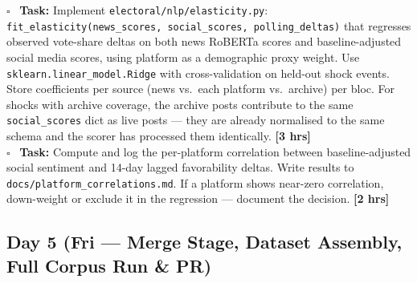 \documentclass[11pt]{article}
\newcommand{\hrs}[1]{\textbf{[#1 hrs]}}
\newcommand{\dayhead}[2]{%
  \subsection*{Day #1 \normalfont\small\color{codegray}(#2)}}
\newcommand{\task}[2]{%
  \noindent\textbf{Task:} #1 \hfill \hrs{#2}\\}
\newcommand{\done}{\textcolor{sectionblue}{$\square$}\ }
\begin{document}
\begin{taskbox}
\done \task{Implement \texttt{electoral/nlp/elasticity.py}:
  \texttt{fit\_elasticity(news\_scores, social\_scores, polling\_deltas)} that
  regresses observed vote-share deltas on both news RoBERTa scores and
  baseline-adjusted social media scores, using platform as a demographic proxy
  weight. Use \texttt{sklearn.linear\_model.Ridge} with cross-validation on
  held-out shock events. Store coefficients per source (news vs.\ each platform
  vs.\ archive) per bloc. For shocks with archive coverage, the archive posts
  contribute to the same \texttt{social\_scores} dict as live posts --- they
  are already normalised to the same schema and the scorer has processed them
  identically.}{3}

\done \task{Compute and log the per-platform correlation between baseline-adjusted
  social sentiment and 14-day lagged favorability deltas. Write results to
  \texttt{docs/platform\_correlations.md}. If a platform shows near-zero
  correlation, down-weight or exclude it in the regression --- document the
  decision.}{2}
\end{taskbox}

\dayhead{5}{Fri --- Merge Stage, Dataset Assembly, Full Corpus Run \& PR}
\end{document}
